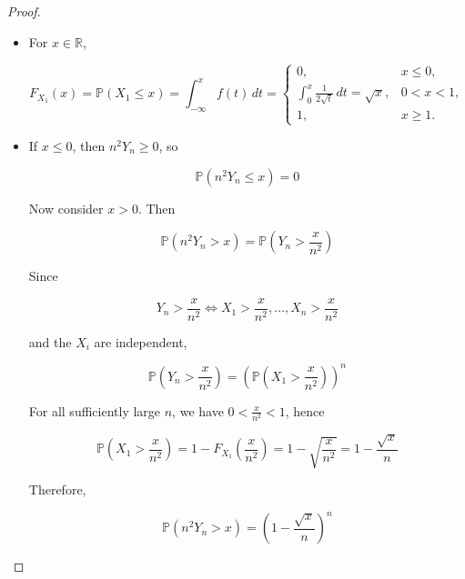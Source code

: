\begin{proof}

\begin{itemize}
\item
  For \(\mathit{x} \in \mathbb{R}\),

  \[\mathit{F}_{\mathit{X}_{1}}(\mathit{x}) = \mathbb{P}(\mathit{X}_{1} \leq \mathit{x}) = \int_{- \infty}^{\mathit{x}}\mathit{f}(\mathit{t})\,\mathit{d}\mathit{t} = \left\{ \begin{matrix}
  {0,} & {\mathit{x} \leq 0,} \\
  {\int_{0}^{\mathit{x}}\frac{1}{2\sqrt{\mathit{t}}}\,\mathit{d}\mathit{t} = \sqrt{\mathit{x}},} & {0 < \mathit{x} < 1,} \\
  {1,} & {\mathit{x} \geq 1.}
  \end{matrix} \right.\]
\item
  If \(\mathit{x} \leq 0\), then \(\mathit{n}^{2}\mathit{Y}_{\mathit{n}} \geq 0\), so

  \[\mathbb{P}(\mathit{n}^{2}\mathit{Y}_{\mathit{n}} \leq \mathit{x}) = 0\]

  Now consider \(\mathit{x} > 0\). Then

  \[\mathbb{P}(\mathit{n}^{2}\mathit{Y}_{\mathit{n}} > \mathit{x}) = \mathbb{P}\left( {\mathit{Y}_{\mathit{n}} > \frac{\mathit{x}}{\mathit{n}^{2}}} \right)\]

  Since

  \[\mathit{Y}_{\mathit{n}} > \frac{\mathit{x}}{\mathit{n}^{2}}\Leftrightarrow\mathit{X}_{1} > \frac{\mathit{x}}{\mathit{n}^{2}},\ldots,\mathit{X}_{\mathit{n}} > \frac{\mathit{x}}{\mathit{n}^{2}}\]

  and the \(\mathit{X}_{\mathit{i}}\) are independent,

  \[\mathbb{P}\left( {\mathit{Y}_{\mathit{n}} > \frac{\mathit{x}}{\mathit{n}^{2}}} \right) = \left( {\mathbb{P}\left( {\mathit{X}_{1} > \frac{\mathit{x}}{\mathit{n}^{2}}} \right)} \right)^{\mathit{n}}\]

  For all sufficiently large \(\mathit{n}\), we have \(0 < \frac{\mathit{x}}{\mathit{n}^{2}} < 1\), hence

  \[\mathbb{P}\left( {\mathit{X}_{1} > \frac{\mathit{x}}{\mathit{n}^{2}}} \right) = 1 - \mathit{F}_{\mathit{X}_{1}}\left( \frac{\mathit{x}}{\mathit{n}^{2}} \right) = 1 - \sqrt{\frac{\mathit{x}}{\mathit{n}^{2}}} = 1 - \frac{\sqrt{\mathit{x}}}{\mathit{n}}\]

  Therefore,

  \[\mathbb{P}(\mathit{n}^{2}\mathit{Y}_{\mathit{n}} > \mathit{x}) = \left( {1 - \frac{\sqrt{\mathit{x}}}{\mathit{n}}} \right)^{\mathit{n}}\]


\end{itemize}
\end{proof}

